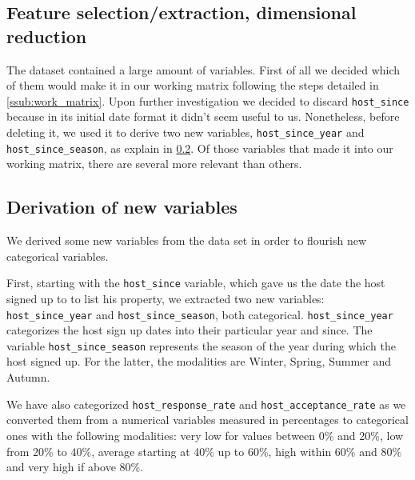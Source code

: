 \subsection{Feature selection/extraction, dimensional reduction}

The \airbnb dataset contained a large amount of variables. First of all we
decided which of them would make it in our working matrix following the steps
detailed in \ref{ssub:work_matrix}. Upon further investigation we decided to
discard \texttt{host\_since} because in its initial date format it didn't
seem useful to us. Nonetheless, before deleting it, we used it to derive two
new variables, \texttt{host\_since\_year} and \texttt{host\_since\_season},
as explain in \ref{ssub:variable_derivation}.
Of those variables that made it into our working matrix, there are several
more relevant than others.

\begin{comment} %

\subsubsection{Instance selection}

\subsubsection{Data transformation}

\end{comment}

\subsection{Derivation of new variables}
\label{ssub:variable_derivation}

We derived some new variables from the data set in order to flourish new
categorical variables.

First, starting with the \texttt{host\_since} variable, which gave us the date
the host signed up to \airbnb to list his property, we extracted two new
variables: \texttt{host\_since\_year} and \texttt{host\_since\_season}, both
categorical. \texttt{host\_since\_year} categorizes the host sign up dates into
their particular year and since. The variable \texttt{host\_since\_season}
represents the season of the year during which the host signed up. For the
latter, the modalities are Winter, Spring, Summer and Autumn.

We have also categorized \texttt{host\_response\_rate} and
\texttt{host\_acceptance\_rate} as we converted them from a numerical 
variables
measured in percentages to categorical ones with the following 
modalities: very
low for values between 0\% and 20\%, low from 20\% to 40\%, average 
starting at 40\% up to 60\%, high within 60\% and 80\% and very high if
above 80\%.


